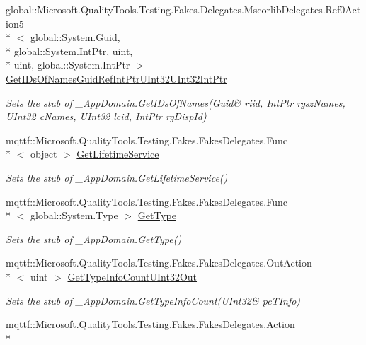 \begin{DoxyCompactItemize}
global\-::\-Microsoft.\-Quality\-Tools.\-Testing.\-Fakes.\-Delegates.\-Mscorlib\-Delegates.\-Ref0\-Action5\\*
$<$ global\-::\-System.\-Guid, \\*
global\-::\-System.\-Int\-Ptr, uint, \\*
uint, global\-::\-System.\-Int\-Ptr $>$ \hyperlink{class_system_1_1_fakes_1_1_stub___app_domain_a869481343cf0c39deef9087376bb2974}{Get\-I\-Ds\-Of\-Names\-Guid\-Ref\-Int\-Ptr\-U\-Int32\-U\-Int32\-Int\-Ptr}
\begin{DoxyCompactList}\small\item\em Sets the stub of \-\_\-\-App\-Domain.\-Get\-I\-Ds\-Of\-Names(Guid\& riid, Int\-Ptr rgsz\-Names, U\-Int32 c\-Names, U\-Int32 lcid, Int\-Ptr rg\-Disp\-Id)\end{DoxyCompactList}\item 
mqttf\-::\-Microsoft.\-Quality\-Tools.\-Testing.\-Fakes.\-Fakes\-Delegates.\-Func\\*
$<$ object $>$ \hyperlink{class_system_1_1_fakes_1_1_stub___app_domain_a4ffb869bfc6c60896d21e73ddd416936}{Get\-Lifetime\-Service}
\begin{DoxyCompactList}\small\item\em Sets the stub of \-\_\-\-App\-Domain.\-Get\-Lifetime\-Service()\end{DoxyCompactList}\item 
mqttf\-::\-Microsoft.\-Quality\-Tools.\-Testing.\-Fakes.\-Fakes\-Delegates.\-Func\\*
$<$ global\-::\-System.\-Type $>$ \hyperlink{class_system_1_1_fakes_1_1_stub___app_domain_a2c18b95864378ff53e20922170568fb2}{Get\-Type}
\begin{DoxyCompactList}\small\item\em Sets the stub of \-\_\-\-App\-Domain.\-Get\-Type()\end{DoxyCompactList}\item 
mqttf\-::\-Microsoft.\-Quality\-Tools.\-Testing.\-Fakes.\-Fakes\-Delegates.\-Out\-Action\\*
$<$ uint $>$ \hyperlink{class_system_1_1_fakes_1_1_stub___app_domain_a7a95b74d9632d891e04bd3c6b1585815}{Get\-Type\-Info\-Count\-U\-Int32\-Out}
\begin{DoxyCompactList}\small\item\em Sets the stub of \-\_\-\-App\-Domain.\-Get\-Type\-Info\-Count(U\-Int32\& pc\-T\-Info)\end{DoxyCompactList}\item 
mqttf\-::\-Microsoft.\-Quality\-Tools.\-Testing.\-Fakes.\-Fakes\-Delegates.\-Action\\*

\end{DoxyCompactItemize}
